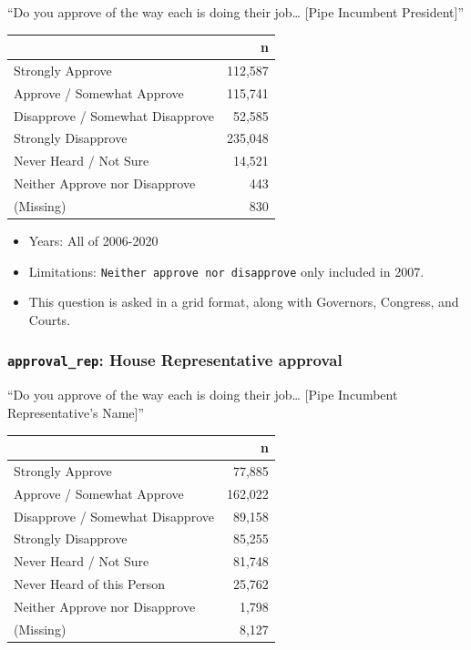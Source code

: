 \documentclass[10pt,article,oneside]{memoir}
\theoremstyle{definition}
\begin{document}
``Do you approve of the way each is doing their job\ldots{} {[}Pipe
Incumbent President{]}''

\begin{table}[H]
\centering
\begin{tabular}{lr}
\toprule
 & n\\
\midrule
Strongly Approve & 112,587\\
Approve / Somewhat Approve & 115,741\\
Disapprove / Somewhat Disapprove & 52,585\\
Strongly Disapprove & 235,048\\
Never Heard / Not Sure & 14,521\\
Neither Approve nor Disapprove & 443\\
(Missing) & 830\\
\bottomrule
\end{tabular}
\end{table}

\begin{itemize}
\tightlist
\item
  Years: All of 2006-2020
\item
  Limitations: \texttt{Neither\ approve\ nor\ disapprove} only included
  in 2007.
\item
  This question is asked in a grid format, along with Governors,
  Congress, and Courts.
\end{itemize}

\hypertarget{approval_rep-house-representative-approval}{%
\subsubsection{\texorpdfstring{\texttt{approval\_rep}: House
Representative
approval}{approval\_rep: House Representative approval}}\label{approval_rep-house-representative-approval}}

``Do you approve of the way each is doing their job\ldots{} {[}Pipe
Incumbent Representative's Name{]}''

\begin{table}[H]
\centering
\begin{tabular}{lr}
\toprule
 & n\\
\midrule
Strongly Approve & 77,885\\
Approve / Somewhat Approve & 162,022\\
Disapprove / Somewhat Disapprove & 89,158\\
Strongly Disapprove & 85,255\\
Never Heard / Not Sure & 81,748\\
Never Heard of this Person & 25,762\\
Neither Approve nor Disapprove & 1,798\\
(Missing) & 8,127\\
\bottomrule
\end{tabular}
\end{table}
\end{document}
